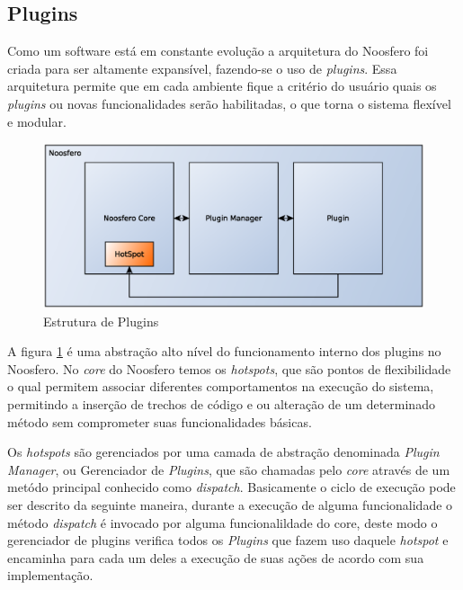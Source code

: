 \subsection{Plugins}

Como um software está em constante evolução a arquitetura do Noosfero foi criada para ser altamente expansível, fazendo-se o uso de \textit{plugins}. Essa arquitetura permite que em cada ambiente fique a critério do usuário quais os \textit{plugins} ou novas funcionalidades serão habilitadas, o que torna o sistema flexível e modular.

\begin{figure}[h]
    \centering
    \includegraphics[keepaspectratio=true,scale=0.4]
      {figuras/estruturaDePlugins.eps}
    \caption{Estrutura de Plugins}
    \label{estrutura-plugins}
\end{figure}

A figura \ref{estrutura-plugins} é uma abstração alto nível do funcionamento interno dos plugins no Noosfero. No \textit{core} do Noosfero temos os \textit{hotspots}, que são pontos de flexibilidade o qual permitem associar diferentes comportamentos na execução do sistema, permitindo a inserção de trechos de código e ou alteração de um determinado método sem comprometer suas funcionalidades básicas.

Os \textit{hotspots} são gerenciados por uma camada de abstração denominada \textit{Plugin Manager}, ou Gerenciador de \textit{Plugins}, que são chamadas pelo \textit{core} através de um metódo principal conhecido como \textit{dispatch}. Basicamente o ciclo de execução pode ser descrito da seguinte maneira, durante a execução de alguma funcionalidade o método \textit{dispatch} é invocado por alguma funcionalildade do core, deste modo o gerenciador de plugins verifica todos os \textit{Plugins} que fazem uso daquele \textit{hotspot} e encaminha para cada um deles a execução de suas ações de acordo com sua implementação.

